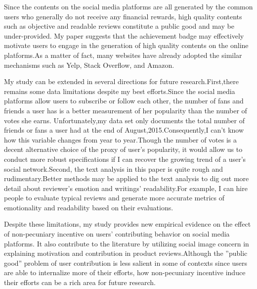 \documentclass[12pt]{article}%
\begin{document}
Since the contents on the social media platforms are all generated by the common users who generally do not receive any financial rewards, high quality contents such as objective and readable reviews constitute a public good and may be under-provided. My paper suggests that the achievement badge may effectively motivate users to engage in the generation of high quality contents on the online platforms.As a matter of fact, many websites have already adopted the similar mechanisms such as Yelp, Stack Overflow, and Amazon.

My study can be extended in several directions for future research.First,there remains some data limitations despite my best efforts.Since the social media platforms allow users to subscribe or follow each other, the number of fans and friends a user has is a better measurement of her popularity than the number of votes she earns. Unfortunately,my data set only documents the total number of friends or fans a user had at the end of August,2015.Consequently,I can't know how this variable changes from year to year.Though the number of votes is a decent alternative choice of the proxy of user's popularity, it would allow us to conduct more robust specifications if I can recover the growing trend of a user's social network.Second, the text analysis in this paper is quite rough and rudimentary.Better methods may be applied to the text analysis to dig out more detail about reviewer's emotion and writings' readability.For example, I can hire people to evaluate typical reviews and generate more accurate metrics of emotionality and readability based on their evaluations.

Despite these limitations, my study provides new empirical evidence on the effect of non-pecuniary incentive on users' contributing behavior on social media platforms. It also contribute to the literature by utilizing social image concern in explaining motivation and contribution in product reviews.Although the ''public good'' problem of user contribution is less salient in some of contexts since users are able to internalize more of their efforts, how non-pecuniary incentive induce their efforts can be a rich area for future research.
  


\singlespacing






\end{document}
